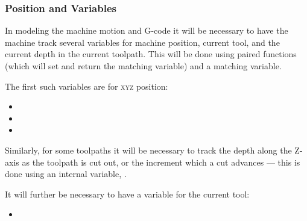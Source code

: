 \documentclass{ltxdoc}
\begin{document}
%

\subsubsection{Position and Variables}
 
In modeling the machine motion and G-code it will be necessary to have the machine track several variables for machine position, current tool, and the current depth in the current toolpath. This will be done using paired functions (which will set and return the  matching variable) and a matching variable.

\begin{samepage}
The first such variables are for \textsc{xyz} position:

\begin{itemize}
 \item {}
 \item {}
 \item {}
\end{itemize}
\end{samepage}

\noindent Similarly, for some toolpaths it will be necessary to track the depth along the Z-axis as the toolpath is cut out, or the increment which a cut advances --- this is done using an internal variable, .
% 

\begin{samepage}

It will further be necessary to have a variable for the current tool:

\begin{itemize}
 \item {}
\end{itemize}
\end{samepage}
\end{document}
